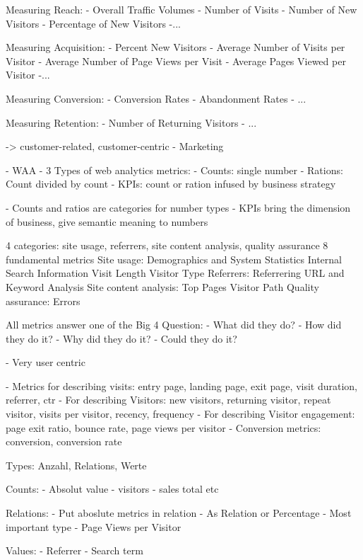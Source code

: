  Measuring Reach:
 - Overall Traffic Volumes
 - Number of Visits
- Number of New Visitors
- Percentage of New Visitors
-...

 Measuring Acquisition:
- Percent New Visitors
- Average Number of Visits per Visitor
- Average Number of Page Views per Visit
- Average Pages Viewed per Visitor
-...
 
 Measuring Conversion:
 - Conversion Rates
- Abandonment Rates
- ... 
 
 
 Measuring Retention:
 - Number of Returning Visitors
 - ...
 
-> customer-related, customer-centric
- Marketing


- WAA
- 3 Types of web analytics metrics:
- Counts: single number
- Rations: Count divided by count
- KPIs: count or ration infused by business strategy

- Counts and ratios are categories for number types
- KPIs bring the dimension of business, give semantic meaning to numbers


 4 categories: site usage, referrers, site content analysis, quality assurance
 8 fundamental metrics
 Site usage:
	 Demographics and System Statistics
	 Internal Search Information
	 Visit Length
	 Visitor Type	
 Referrers:
	 Referrering URL and Keyword Analysis	
 Site content analysis:
	 Top Pages
	 Visitor Path
 Quality assurance:
	 Errors
	 
	 
All metrics answer one of the Big 4 Question:
- What did they do?
- How did they do it?
- Why did they do it?
- Could they do it?

- Very user centric



- Metrics for describing visits: entry page, landing page, exit page, visit duration, referrer, ctr
- For describing Visitors: new visitors, returning visitor, repeat visitor, visits per visitor, recency, frequency
- For describing Visitor engagement: page exit ratio, bounce rate, page views per visitor
- Conversion metrics: conversion, conversion rate



 Types: Anzahl, Relations, Werte
 
Counts:
- Absolut value
- visitors
- sales total
etc

Relations:
- Put aboslute metrics in relation
- As Relation or Percentage
- Most important type
- Page Views per Visitor

Values:
- Referrer
- Search term 
 

